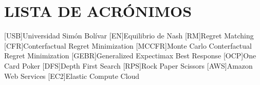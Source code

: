 
\chapter*{LISTA DE ACRÓNIMOS}
\begin{acronym}
[USB]{Universidad Simón Bolívar}
[EN]{Equilibrio de Nash}
[RM]{Regret Matching}
[CFR]{Conterfactual Regret Minimization}
[MCCFR]{Monte Carlo Conterfactual Regret Minimization}
[GEBR]{Generalized Expectimax Best Response}
[OCP]{One Card Poker}
[DFS]{Depth First Search}
[RPS]{Rock Paper Scissors}
[AWS]{Amazon Web Services}
[EC2]{Elastic Compute Cloud}
\end{acronym}
\clearpage